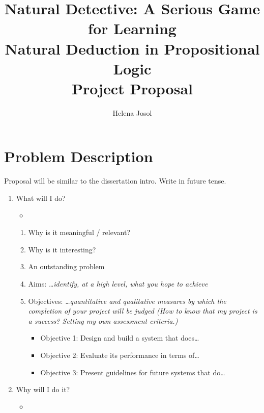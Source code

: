 \documentclass[a4paper]{article}
\title{Natural Detective: A Serious Game for Learning \\ Natural Deduction in Propositional Logic \\
  \medskip \Large{Project Proposal}}
\author{Helena Josol}
\date{}
\begin{document}
\maketitle


\section{Problem Description} %
Proposal will be similar to the dissertation intro. Write in future tense.
\begin{enumerate}
  \item What will I do?
    \begin{itemize}
      \item {}
    \end{itemize}
    \begin{enumerate}
      \item Why is it meaningful / relevant?
      \item Why is it interesting?
      \item An outstanding problem
      \item Aims: \textit{\dots identify, at a high level, what you hope to achieve}
      \item Objectives: \textit{\dots quantitative and qualitative measures by which the completion of your project will be judged (How to know that my project is a success? Setting my own assessment criteria.)}
        \begin{itemize}
          \item Objective 1: Design and build a system that does\dots
          \item Objective 2: Evaluate its performance in terms of\dots
          \item Objective 3: Present guidelines for future systems that do\dots
        \end{itemize}
    \end{enumerate}
  \item Why will I do it?
    \begin{itemize}
      \item {}
      \begin{itemize}

\end{itemize}
\end{itemize}
\end{enumerate}
\end{document}
